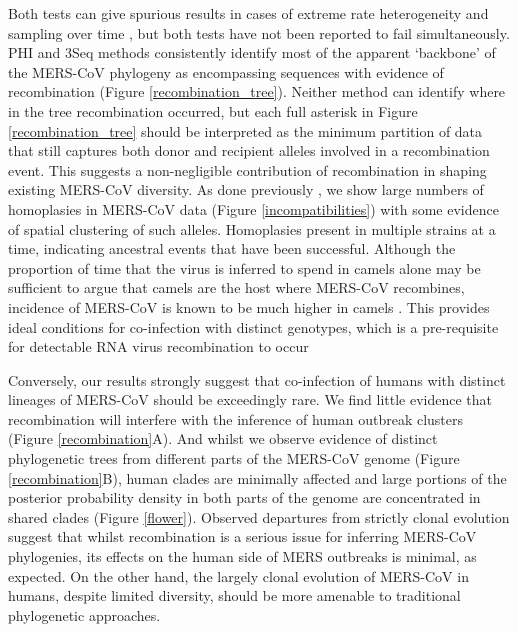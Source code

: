 \documentclass[11pt,oneside,letterpaper]{article}
\def\gdc#1{\textcolor{blue}{[#1]}}
\def\lmc#1{\textcolor{green}{[#1]}}
\begin{document}
Both tests can give spurious results in cases of extreme rate heterogeneity and sampling over time \citep{dudas_mers-cov_2016}, but both tests have not been reported to fail simultaneously.
PHI and 3Seq methods consistently identify most of the apparent `backbone' of the MERS-CoV phylogeny as encompassing sequences with evidence of recombination (Figure \ref{recombination_tree}).
Neither method can identify where in the tree recombination occurred, but each full asterisk in Figure \ref{recombination_tree} should be interpreted as the minimum partition of data that still captures both donor and recipient alleles involved in a recombination event.
This suggests a non-negligible contribution of recombination in shaping existing MERS-CoV diversity.
As done previously \citep{dudas_mers-cov_2016}, we show large numbers of homoplasies in MERS-CoV data (Figure \ref{incompatibilities}) with some evidence of spatial clustering of such alleles.
Homoplasies present in multiple strains at a time, indicating ancestral events that have been successful.
Although the proportion of time that the virus is inferred to spend in camels alone may be sufficient to argue that camels are the host where MERS-CoV recombines, incidence of MERS-CoV is known to be much higher in camels \citep{muller_2014,corman_antibodies_2014,chu_2014,reusken_2014,ali_systematic_2017}.
This provides ideal conditions for co-infection with distinct genotypes, which is a pre-requisite for detectable RNA virus recombination to occur%

Conversely, our results strongly suggest that co-infection of humans with distinct lineages of MERS-CoV should be exceedingly rare.
We find little evidence that recombination will interfere with the inference of human outbreak clusters %
(Figure \ref{recombination}A).
And whilst we observe evidence of distinct phylogenetic trees from different parts of the MERS-CoV genome (Figure \ref{recombination}B), human clades are minimally affected and large portions of the posterior probability density in both parts of the genome are concentrated in shared clades (Figure \ref{flower}).
Observed departures from strictly clonal evolution suggest that whilst recombination is a serious issue for inferring MERS-CoV phylogenies, its effects on the human side of MERS outbreaks is minimal, as expected.
On the other hand, the largely clonal evolution of MERS-CoV in humans, despite limited diversity, should be more amenable to traditional phylogenetic approaches. %
\end{document}

